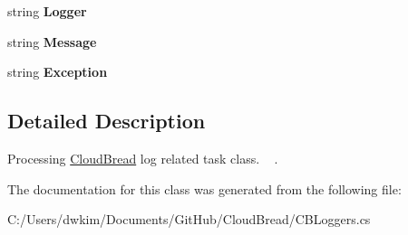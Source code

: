 \begin{DoxyCompactItemize}
\item 
string {\bfseries Logger}\hypertarget{a00028_a65c01d15226be9c3a0c14a3b077f4878}{}\label{a00028_a65c01d15226be9c3a0c14a3b077f4878}

\item 
string {\bfseries Message}\hypertarget{a00028_a4d44ce7a068e4d7ea53bf3491d28ae91}{}\label{a00028_a4d44ce7a068e4d7ea53bf3491d28ae91}

\item 
string {\bfseries Exception}\hypertarget{a00028_a77db68b75ff1d74a0667c3de8435ac80}{}\label{a00028_a77db68b75ff1d74a0667c3de8435ac80}

\end{DoxyCompactItemize}


\subsection{Detailed Description}
Processing \hyperlink{a00217}{Cloud\+Bread} log related task class. ~\newline
. 

The documentation for this class was generated from the following file\+:\begin{DoxyCompactItemize}
\item 
C\+:/\+Users/dwkim/\+Documents/\+Git\+Hub/\+Cloud\+Bread/C\+B\+Loggers.\+cs\end{DoxyCompactItemize}
